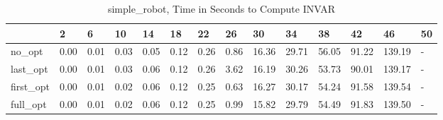 \begin{table}
\caption{simple_robot, Time in Seconds to Compute INVAR}
\label{simple_robot_INVAR_time}
\begin{tabular}{llllllllllllll}
\toprule
 & 2 & 6 & 10 & 14 & 18 & 22 & 26 & 30 & 34 & 38 & 42 & 46 & 50 \\
\midrule
no_opt & 0.00 & 0.01 & 0.03 & 0.05 & 0.12 & 0.26 & 0.86 & 16.36 & 29.71 & 56.05 & 91.22 & 139.19 & - \\
last_opt & 0.00 & 0.01 & 0.03 & 0.06 & 0.12 & 0.26 & 3.62 & 16.19 & 30.26 & 53.73 & 90.01 & 139.17 & - \\
first_opt & 0.00 & 0.01 & 0.02 & 0.06 & 0.12 & 0.25 & 0.63 & 16.27 & 30.17 & 54.24 & 91.58 & 139.54 & - \\
full_opt & 0.00 & 0.01 & 0.02 & 0.06 & 0.12 & 0.25 & 0.99 & 15.82 & 29.79 & 54.49 & 91.83 & 139.50 & - \\
\bottomrule
\end{tabular}
\end{table}
